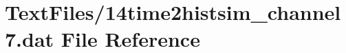 \hypertarget{14time2histsim__channel7_8dat}{}\section{Text\+Files/14time2histsim\+\_\+channel7.dat File Reference}
\label{14time2histsim__channel7_8dat}
